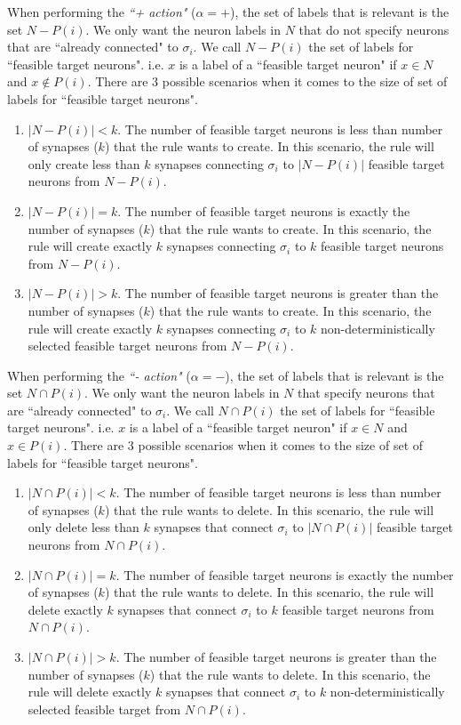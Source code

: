 \documentclass[smallextended]{svjour3}
\begin{document}
When performing the \textit{``+ action"} ($\alpha = +$), the set of labels that is relevant is the set $N-P(i)$. We only want the neuron labels 
in $N$ that do not specify neurons that are ``already connected" to $\sigma_i$. We call $N-P(i)$  the set of labels for ``feasible target neurons". 
i.e. $x$ is a label of a ``feasible target neuron" if $x \in N$ and $x \not\in P(i)$. There are 3 possible scenarios when it comes to the size of
set of labels for ``feasible target neurons". 
\begin{enumerate}
   \item $|N-P(i)| < k$. The number of feasible target neurons is less than number of synapses ($k$) that the rule wants to create. In this scenario,
         the rule will only create less than $k$ synapses connecting $\sigma_i$ to $|N-P(i)|$ feasible target neurons from $N-P(i)$.
   \item $|N-P(i)| = k$. The number of feasible target neurons is exactly the number of synapses ($k$) that the rule wants to create. In this 
         scenario, the rule will create exactly $k$ synapses connecting $\sigma_i$ to $k$ feasible target neurons from $N-P(i)$.
   \item $|N-P(i)| > k$. The number of feasible target neurons is greater than the number of synapses ($k$) that the rule wants to create. In this 
         scenario, the rule will create exactly $k$ synapses connecting $\sigma_i$ to $k$ non-deterministically selected feasible target neurons from 
         $N-P(i)$.
\end{enumerate}

When performing the \textit{``- action"} ($\alpha = -$), the set of labels that is relevant is the set $N \cap P(i)$. We only want the neuron labels 
in $N$ that specify neurons that are ``already connected" to $\sigma_i$. We call $N \cap P(i)$  the set of labels for ``feasible target neurons". 
i.e. $x$ is a label of a ``feasible target neuron" if $x \in N$ and $x \in P(i)$. There are 3 possible scenarios when it comes to the size of
set of labels for ``feasible target neurons". 
\begin{enumerate}
   \item $|N \cap P(i)| < k$. The number of feasible target neurons is less than number of synapses ($k$) that the rule wants to delete. In this
         scenario, the rule will only delete less than $k$ synapses that connect $\sigma_i$ to $|N \cap P(i)|$ feasible target neurons from $N \cap 
         P(i)$.
   \item $|N \cap P(i)| = k$. The number of feasible target neurons is exactly the number of synapses ($k$) that the rule wants to delete. In this 
         scenario, the rule will delete exactly $k$ synapses that connect $\sigma_i$ to $k$ feasible target neurons from $N \cap P(i)$.
   \item $|N \cap P(i)| > k$. The number of feasible target neurons is greater than the number of synapses ($k$) that the rule wants to delete. In 
         this scenario, the rule will delete exactly $k$ synapses that connect $\sigma_i$ to $k$ non-deterministically selected feasible target 
         from $N \cap P(i)$.
\end{enumerate}
\end{document}
